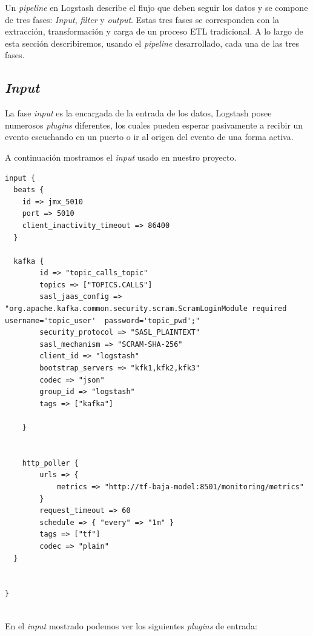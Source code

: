 Un \textit{pipeline} en Logstash describe el flujo que deben seguir los datos y se compone de tres fases: \textit{Input}, \textit{filter} y \textit{output}. Estas tres fases se corresponden con la extracción, transformación y carga de un proceso ETL tradicional. A lo largo de esta sección describiremos, usando el \textit{pipeline} desarrollado, cada una de las tres fases.


\subsection{\textit{Input}}

La fase \textit{input} es la encargada de la entrada de los datos, Logstash posee numerosos \textit{plugins} diferentes, los cuales pueden esperar pasivamente a recibir un evento escuchando en un puerto o ir al origen del evento de una forma activa.

A continuación mostramos el \textit{input} usado en nuestro proyecto.


\begin{verbatim}
input {
  beats {
    id => jmx_5010
    port => 5010
    client_inactivity_timeout => 86400
  }

  kafka {
        id => "topic_calls_topic"
        topics => ["TOPICS.CALLS"]
        sasl_jaas_config => "org.apache.kafka.common.security.scram.ScramLoginModule required username='topic_user'  password='topic_pwd';"
        security_protocol => "SASL_PLAINTEXT"
        sasl_mechanism => "SCRAM-SHA-256"
        client_id => "logstash"
        bootstrap_servers => "kfk1,kfk2,kfk3"
        codec => "json"
        group_id => "logstash"
        tags => ["kafka"]
        
    }


    http_poller {
        urls => {
            metrics => "http://tf-baja-model:8501/monitoring/metrics"
        }
        request_timeout => 60
        schedule => { "every" => "1m" }
        tags => ["tf"]
        codec => "plain"
  }


} 	
 	
\end{verbatim}

En el \textit{input} mostrado podemos ver los siguientes \textit{plugins} de entrada: 


